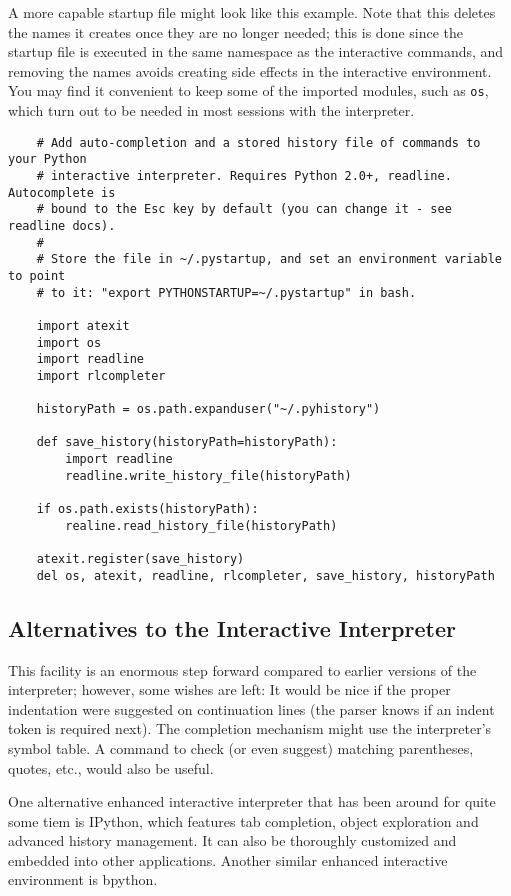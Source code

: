\documentclass[UTF8]{article}
\begin{document}
A more capable startup file might look like this example. Note that this deletes the names it
creates once they are no longer needed; this is done since the startup file is executed in the same
namespace as the interactive commands, and removing the names avoids creating side effects in the
interactive environment. You may find it convenient to keep some of the imported modules, such as
\texttt{os}, which turn out to be needed in most sessions with the interpreter.
\begin{verbatim}
    # Add auto-completion and a stored history file of commands to your Python
    # interactive interpreter. Requires Python 2.0+, readline. Autocomplete is
    # bound to the Esc key by default (you can change it - see readline docs).
    #
    # Store the file in ~/.pystartup, and set an environment variable to point
    # to it: "export PYTHONSTARTUP=~/.pystartup" in bash.

    import atexit
    import os
    import readline
    import rlcompleter

    historyPath = os.path.expanduser("~/.pyhistory")

    def save_history(historyPath=historyPath):
        import readline
        readline.write_history_file(historyPath)

    if os.path.exists(historyPath):
        realine.read_history_file(historyPath)

    atexit.register(save_history)
    del os, atexit, readline, rlcompleter, save_history, historyPath
\end{verbatim}

\subsection{Alternatives to the Interactive Interpreter}
This facility is an enormous step forward compared to earlier versions of the interpreter; however,
some wishes are left: It would be nice if the proper indentation were suggested on continuation
lines (the parser knows if an indent token is required next). The completion mechanism might use
the interpreter's symbol table. A command to check (or even suggest) matching parentheses, quotes,
etc., would also be useful.

One alternative enhanced interactive interpreter that has been around for quite some tiem is
IPython, which features tab completion, object exploration and advanced history management. It can
also be thoroughly customized and embedded into other applications. Another similar enhanced
interactive environment is bpython.
\end{document}
